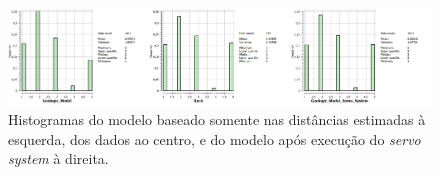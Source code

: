 \begin{figure}[H]
	\caption{\label{servo_valid}Histogramas do modelo baseado somente nas distâncias estimadas à esquerda, dos dados ao centro, e do modelo após execução do \textit{servo system} à direita.}
	\begin{center}
		\includegraphics[width=\textwidth]{modelagem_geologica/servo_valid}
	\end{center}
\end{figure}